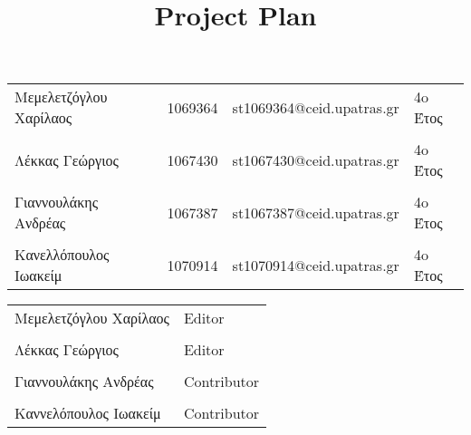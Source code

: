 \documentclass{../ol-softwaremanual}
\begin{document}
	
	
	\begin{titlepage}
		
		
		\title{\en Project Plan \\}
	\end{titlepage}
	
	
	\maketitle
	
	\newpage
	
	
	\vspace{20pt}
	
	
	
	\begin{table}[htbp!]
		
		\begin{tabular}{llll}
			Μεμελετζόγλου Χαρίλαος & 1069364 & \en st1069364@ceid.upatras.gr & 4o Έτος   \\ 
			\\ Λέκκας Γεώργιος      &      1067430    &   \en st1067430@ceid.upatras.gr & 4o Έτος  \\
			\\ Γιαννουλάκης Ανδρέας        &   1067387       & \en st1067387@ceid.upatras.gr & 4o Έτος           \\
			\\ Κανελλόπουλος Ιωακείμ        &  1070914        &    \en st1070914@ceid.upatras.gr & 4o Έτος        \\ 
		\end{tabular}
	\end{table}
	
	
	\vspace{20pt}
	
	\begin{table}[htbp!]
		\begin{tabular}{ll}
			Μεμελετζόγλου Χαρίλαος & \en Editor \\
			\\ Λέκκας Γεώργιος      &   \en  Editor \\
			\\ Γιαννουλάκης Ανδρέας & \en Contributor \\
			\\ Καννελόπουλος Ιωακείμ & \en Contributor \\ 
		\end{tabular}
	\end{table}
	
\end{document}
